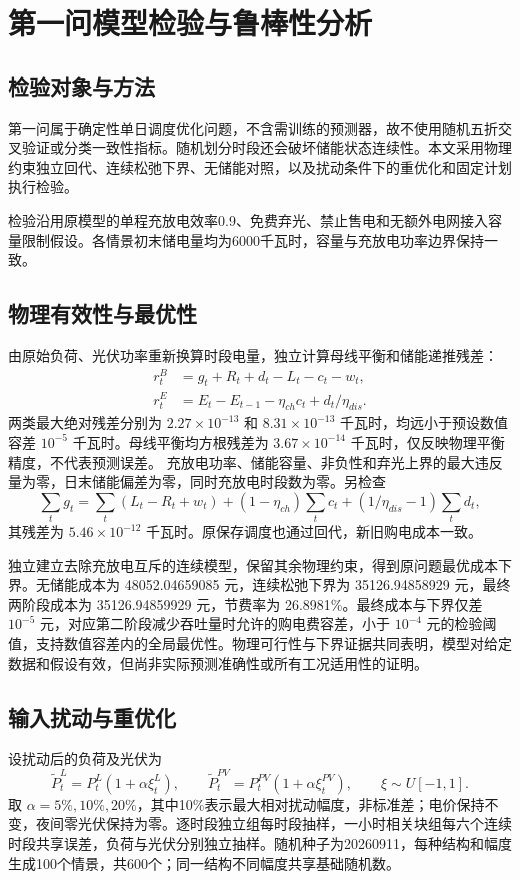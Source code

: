 \section{第一问模型检验与鲁棒性分析}
\label{sec:q1-validation}

\subsection{检验对象与方法}
第一问属于确定性单日调度优化问题，不含需训练的预测器，故不使用随机五折交叉验证或分类一致性指标。随机划分时段还会破坏储能状态连续性。本文采用物理约束独立回代、连续松弛下界、无储能对照，以及扰动条件下的重优化和固定计划执行检验。

检验沿用原模型的单程充放电效率0.9、免费弃光、禁止售电和无额外电网接入容量限制假设。各情景初末储电量均为6000千瓦时，容量与充放电功率边界保持一致。

\subsection{物理有效性与最优性}
由原始负荷、光伏功率重新换算时段电量，独立计算母线平衡和储能递推残差：
\begin{align}
r_t^B&=g_t+R_t+d_t-L_t-c_t-w_t,\\
r_t^E&=E_t-E_{t-1}-\eta_{ch}c_t+d_t/\eta_{dis}.
\end{align}
两类最大绝对残差分别为 $2.27\times10^{-13}$ 和 $8.31\times10^{-13}$ 千瓦时，均远小于预设数值容差 $10^{-5}$ 千瓦时。母线平衡均方根残差为 $3.67\times10^{-14}$ 千瓦时，仅反映物理平衡精度，不代表预测误差。
充放电功率、储能容量、非负性和弃光上界的最大违反量为零，日末储能偏差为零，同时充放电时段数为零。另检查
\begin{equation}
\sum_tg_t=\sum_t(L_t-R_t+w_t)+(1-\eta_{ch})\sum_tc_t
+(1/\eta_{dis}-1)\sum_td_t,
\end{equation}
其残差为 $5.46\times10^{-12}$ 千瓦时。原保存调度也通过回代，新旧购电成本一致。

独立建立去除充放电互斥的连续模型，保留其余物理约束，得到原问题最优成本下界。无储能成本为 48052.04659085 元，连续松弛下界为 35126.94858929 元，最终两阶段成本为 35126.94859929 元，节费率为 26.8981\%。最终成本与下界仅差 $10^{-5}$ 元，对应第二阶段减少吞吐量时允许的购电费容差，小于 $10^{-4}$ 元的检验阈值，支持数值容差内的全局最优性。物理可行性与下界证据共同表明，模型对给定数据和假设有效，但尚非实际预测准确性或所有工况适用性的证明。

\subsection{输入扰动与重优化}
设扰动后的负荷及光伏为
\begin{equation}
\widetilde P_t^L=P_t^L(1+\alpha\xi_t^L),\qquad
\widetilde P_t^{PV}=P_t^{PV}(1+\alpha\xi_t^{PV}),\qquad
\xi\sim U[-1,1].
\end{equation}
取 $\alpha=5\%,10\%,20\%$，其中10\%表示最大相对扰动幅度，非标准差；电价保持不变，夜间零光伏保持为零。逐时段独立组每时段抽样，一小时相关块组每六个连续时段共享误差，负荷与光伏分别独立抽样。随机种子为20260911，每种结构和幅度生成100个情景，共600个；同一结构不同幅度共享基础随机数。

